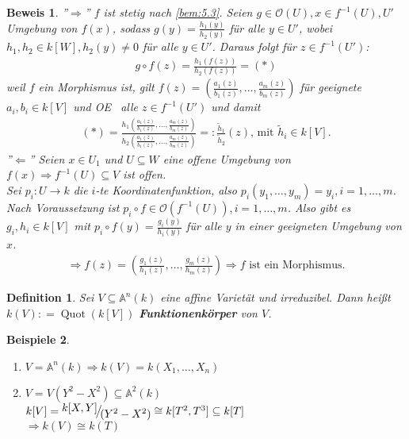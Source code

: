 \documentclass[a4paper,12pt]{report}
\theoremstyle{break}
\newtheorem{Def}{Definition}[section]
\newtheorem{Bsp}[Def]{Beispiele}
\theoremstyle{nonumberbreak}
\theoremstyle{nonumberplain}
\newtheorem{Bew}{Beweis}
\newcommand{\emp}[1]{\textbf{\emph{#1}}}
\newcommand{\begriff}[1]{{\index{#1}}\emp{#1}}
\newcommand{\defeqr}[0]{\mathrel{\mathop:}=}
\newcommand{\defeql}[0]{=\mathrel{\mathop:}}
\DeclareMathOperator{\Quot}{Quot}
\newcommand{\FakRaum}[2]{
  \raisebox{0.7ex}{\ensuremath{#1}}
  \ensuremath{\mkern-3mu}\big/\ensuremath{\mkern-3mu}
  \raisebox{-0.6ex}{\ensuremath{#2}}}
\renewcommand{\OE}{O\!\!E}
\begin{document}
\begin{Bew}
  ''$\Rightarrow$'' $f$ ist stetig nach \ref{bem:5.3}. 
  Seien $g\in\mathcal O(U), x\in f^{-1}(U), U'$ Umgebung von $f(x)$, sodass $g(y)=\frac{h_1(y)}{h_2(y)}$ für alle $y\in U'$, wobei $h_1,h_2\in k[W], h_2(y)\neq 0$ für alle $y\in U'$. Daraus folgt für $z\in f^{-1}(U')$:
  \begin{align*}
    g\circ f(z)=\frac{h_1(f(z))}{h_2(f(z))}=(*)
  \end{align*}
  weil $f$ ein Morphismus ist, gilt $f(z)=\left(\frac{a_1(z)}{b_1(z)},\dots,\frac{a_m(z)}{b_m(z)}\right)$ für geeignete $a_i,b_i\in k[V]$ und \OE~  alle $z\in f^{-1}(U')$ und damit
  \begin{align*}
    (*)=\frac{h_1 \left( \frac{a_1(z)}{b_1(z)}, \dots, \frac{a_m(z)}{b_m(z)} \right)}{h_2 \left( \frac{a_1(z)}{b_1(z)}, \dots, \frac{a_m(z)}{b_m(z)} \right)} \defeql \frac{\tilde{h}_1}{\tilde{h}_2}(z)\text{, mit } \tilde{h}_i\in k[V].
  \end{align*}
  ''$\Leftarrow$'' Seien $x\in U_1$ und $U\subseteq W$ eine offene Umgebung von $f(x)\Rightarrow f^{-1}(U)\subseteq V$ ist offen. \\
  Sei $p_i:U\longrightarrow k$ die $i$-te Koordinatenfunktion, also $p_i(y_1,\dots,y_m)=y_i, i=1,\dots,m$. Nach Voraussetzung ist $p_i\circ f\in\mathcal O(f^{-1}(U)), i=1,\dots,m$. Also gibt es $g_i, h_i \in k[V]$ mit $p_i\circ f(y)=\frac{g_i(y)}{h_i(y)}$ für alle $y$ in einer geeigneten Umgebung von $x$.
  \begin{align*}
    \Rightarrow f(z)=\left(\frac{g_1(z)}{h_1(z)},\dots,\frac{g_m(z)}{h_m(z)}\right) \Rightarrow f \text{ ist ein Morphismus.}
  \end{align*}
\end{Bew}
\begin{Def}
  \label{def:6.10}
  Sei $V\subseteq\mathbb A^n(k)$ eine affine Varietät und irreduzibel. Dann heißt $k(V)\defeqr\Quot(k[V])$ \begriff{Funktionenkörper} von $V$.
\end{Def}
\begin{Bsp}
  \begin{enumerate}
  \item $V=\mathbb A^n(k)\Rightarrow k(V)=k(X_1,\dots,X_n)$ \\
  \item $V=V(Y^2-X^2)\subseteq\mathbb A^2(k)$ \\
    $k[V]=\FakRaum{k[X,Y]}{(Y^2-X^2)}\cong k[T^2,T^3]\subseteq k[T]$ \\
    $\Rightarrow k(V)\cong k(T)$
  \end{enumerate}
\end{Bsp}
\end{document}
